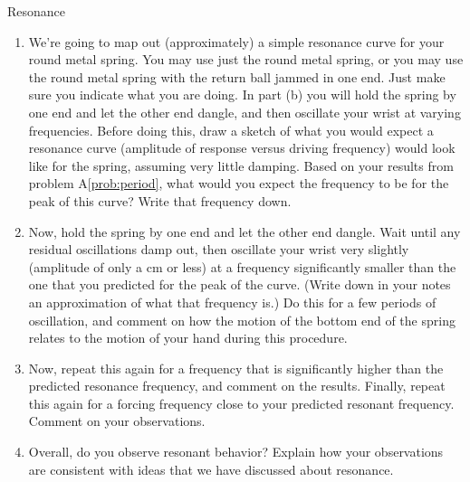 \begin{aproblem}{Resonance}
  \begin{enumerate}
  \item We're going to map out (approximately) a simple resonance
    curve for your round metal spring.  You may use just the round
    metal spring, or you may use the round metal spring with the
    return ball jammed in one end.  Just make sure you indicate what
    you are doing.  In part (b) you will hold the spring by one end
    and let the other end dangle, and then oscillate your wrist at
    varying frequencies.  Before doing this, draw a sketch of what you
    would expect a resonance curve (amplitude of response versus
    driving frequency) would look like for the spring, assuming very
    little damping.  Based on your results from problem
    A\ref{prob:period}, what would you expect the frequency to be for
    the peak of this curve?  Write that frequency down.

  \item Now, hold the spring by one end and let the other end dangle.
    Wait until any residual oscillations damp out, then oscillate your
    wrist very slightly (amplitude of only a cm or less) at a
    frequency significantly smaller than the one that you predicted
    for the peak of the curve.  (Write down in your notes an
    approximation of what that frequency is.)  Do this for a few
    periods of oscillation, and comment on how the motion of the
    bottom end of the spring relates to the motion of your hand during
    this procedure.

  \item Now, repeat this again for a frequency that is significantly
    higher than the predicted resonance frequency, and comment on the
    results.  Finally, repeat this again for a forcing frequency close
    to your predicted resonant frequency.  Comment on your
    observations.

  \item Overall, do you observe resonant behavior?  Explain how your
    observations are consistent with ideas that we have discussed
    about resonance.
  \end{enumerate}
\end{aproblem}


